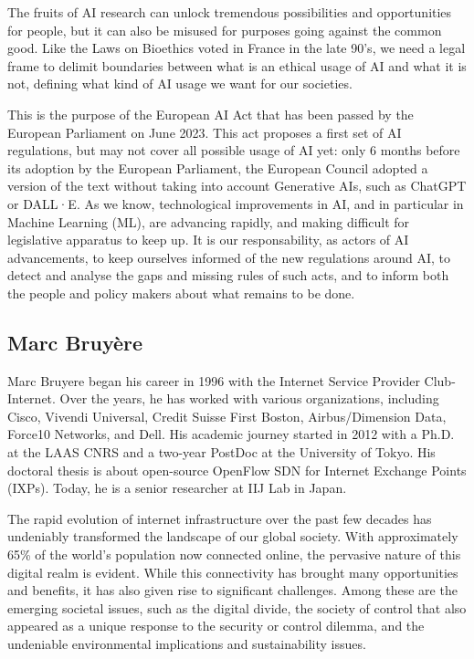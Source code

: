 \documentclass[conference]{IEEEtran}
\begin{document}
The  fruits of  AI research  can unlock  tremendous possibilities  and
opportunities  for people,  but it  can also  be misused  for purposes
going against  the common good.  Like the  Laws on Bioethics  voted in
France in the  late 90’s, we need a legal  frame to delimit boundaries
between what is  an ethical usage of  AI and what it  is not, defining
what kind of AI usage we want for our societies.

This is the purpose of the European AI Act that has been passed by the
European Parliament on June 2023. This  act proposes a first set of AI
regulations, but  may not cover all  possible usage of AI  yet: only 6
months before  its adoption by  the European Parliament,  the European
Council  adopted a  version of  the text  without taking  into account
Generative AIs, such  as ChatGPT or DALL·E. As  we know, technological
improvements in  AI, and in  particular in Machine Learning  (ML), are
advancing rapidly,  and making difficult for  legislative apparatus to
keep up.  It is our responsability,  as actors of AI  advancements, to
keep ourselves  informed of the  new regulations around AI,  to detect
and analyse  the gaps and  missing rules of  such acts, and  to inform
both the people and policy makers about what remains to be done.

\subsection{Marc Bruyère}
Marc  Bruyere began  his  career  in 1996  with  the Internet  Service
Provider Club-Internet.  Over the  years, he  has worked  with various
organizations, including Cisco, Vivendi Universal, Credit Suisse First
Boston,  Airbus/Dimension  Data,  Force10   Networks,  and  Dell.  His
academic journey started in  2012 with a Ph.D. at the  LAAS CNRS and a
two-year PostDoc  at the University  of Tokyo. His doctoral  thesis is
about   open-source  OpenFlow   SDN  for   Internet  Exchange   Points
(IXPs). Today, he is a senior researcher at IIJ Lab in Japan.

The  rapid evolution  of  internet infrastructure  over  the past  few
decades  has  undeniably  transformed  the  landscape  of  our  global
society.  With  approximately  65\%  of  the  world’s  population  now
connected  online,  the pervasive  nature  of  this digital  realm  is
evident.  While  this connectivity has brought  many opportunities and
benefits,  it has  also given  rise to  significant challenges.  Among
these are  the emerging societal  issues, such as the  digital divide,
the society of control that also  appeared as a unique response to the
security  or   control  dilemma,  and  the   undeniable  environmental
implications and sustainability issues.
\end{document}

